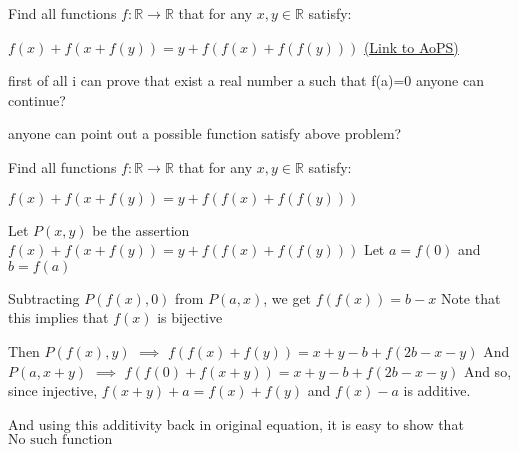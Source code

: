 \begin{problem}
	Find all functions $f: \mathbb{R} \to \mathbb{R}$ that for any $x,y \in \mathbb{R}$ satisfy:

$f(x)+f(x+f(y))=y+f(f(x)+f(f(y)))$
	\flushright \href{https://artofproblemsolving.com/community/c6h1574379}{(Link to AoPS)}
\end{problem}



\begin{solution}
	first of all i can prove that exist a real number a such that f(a)=0 anyone can continue?

\end{solution}



\begin{solution}
	anyone can point out a possible function satisfy above problem?
\end{solution}



\begin{solution}
	\begin{tcolorbox}Find all functions $f: \mathbb{R} \to \mathbb{R}$ that for any $x,y \in \mathbb{R}$ satisfy:

$f(x)+f(x+f(y))=y+f(f(x)+f(f(y)))$\end{tcolorbox}
Let $P(x,y)$ be the assertion $f(x)+f(x+f(y))=y+f(f(x)+f(f(y)))$
Let $a=f(0)$ and $b=f(a)$

Subtracting $P(f(x),0)$ from $P(a,x)$, we get  $f(f(x))=b-x$
Note that this implies that $f(x)$ is bijective

Then $P(f(x),y)$ $\implies$ $f(f(x)+f(y))=x+y-b+f(2b-x-y)$
And $P(a,x+y)$ $\implies$ $f(f(0)+f(x+y))=x+y-b+f(2b-x-y)$
And so, since injective, $f(x+y)+a=f(x)+f(y)$ and $f(x)-a$ is additive.

And using this additivity back in original equation, it is easy to show that
$\boxed{\text{No such function}}$


\end{solution}



